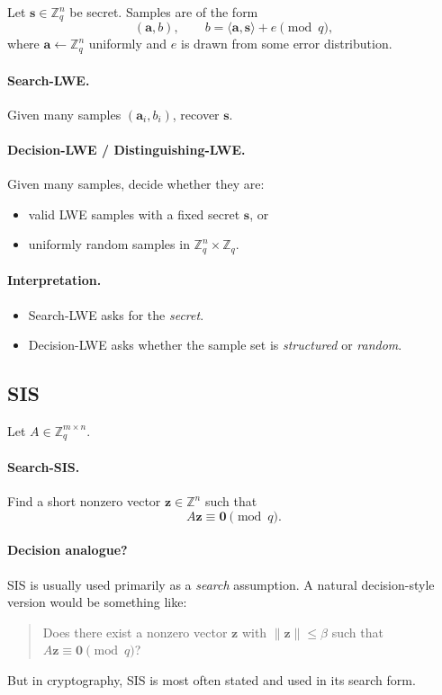 \documentclass[11pt]{article}
\begin{document}
	Let $\bm s \in \mathbb{Z}_q^n$ be secret. Samples are of the form
	\[
	(\bm a, b), \qquad b = \langle \bm a,\bm s\rangle + e \pmod q,
	\]
	where $\bm a \leftarrow \mathbb{Z}_q^n$ uniformly and $e$ is drawn from some error distribution.
	
	\paragraph{Search-LWE.}
	Given many samples $(\bm a_i,b_i)$, recover $\bm s$.
	
	\paragraph{Decision-LWE / Distinguishing-LWE.}
	Given many samples, decide whether they are:
	\begin{itemize}
		\item valid LWE samples with a fixed secret $\bm s$, or
		\item uniformly random samples in $\mathbb{Z}_q^n \times \mathbb{Z}_q$.
	\end{itemize}
	
	\paragraph{Interpretation.}
	\begin{itemize}
		\item Search-LWE asks for the \emph{secret}.
		\item Decision-LWE asks whether the sample set is \emph{structured} or \emph{random}.
	\end{itemize}
	
	\subsection{SIS}
	
	Let $A \in \mathbb{Z}_q^{m\times n}$.
	
	\paragraph{Search-SIS.}
	Find a short nonzero vector $\bm z \in \mathbb{Z}^n$ such that
	\[
	A\bm z \equiv \bm 0 \pmod q.
	\]
	
	\paragraph{Decision analogue?}
	SIS is usually used primarily as a \emph{search} assumption. A natural decision-style version would be something like:
	\begin{quote}
		Does there exist a nonzero vector $\bm z$ with $\|\bm z\| \le \beta$ such that $A\bm z \equiv \bm 0 \pmod q$?
	\end{quote}
	But in cryptography, SIS is most often stated and used in its search form.
	
\end{document}
